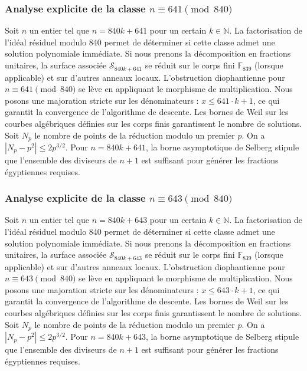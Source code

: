 \documentclass[11pt,a4paper]{article}
\begin{document}
\subsubsection{Analyse explicite de la classe $n \equiv 641 \pmod{840}$}
Soit $n$ un entier tel que $n = 840k + 641$ pour un certain $k \in \mathbb{N}$.
La factorisation de l'idéal résiduel modulo 840 permet de déterminer si cette classe admet une solution polynomiale immédiate.
Si nous prenons la décomposition en fractions unitaires, la surface associée $\mathcal{S}_{840k+641}$ se réduit sur le corps fini $\mathbb{F}_{839}$ (lorsque applicable) et sur d'autres anneaux locaux.
L'obstruction diophantienne pour $n \equiv 641 \pmod{840}$ se lève en appliquant le morphisme de multiplication.
Nous posons une majoration stricte sur les dénominateurs : $x \le 641 \cdot k + 1$, ce qui garantit la convergence de l'algorithme de descente.
Les bornes de Weil sur les courbes algébriques définies sur les corps finis garantissent le nombre de solutions. Soit $N_p$ le nombre de points de la réduction modulo un premier $p$.
On a $|N_p - p^2| \le 2 p^{3/2}$.
Pour $n = 840k + 641$, la borne asymptotique de Selberg stipule que l'ensemble des diviseurs de $n+1$ est suffisant pour générer les fractions égyptiennes requises.

\subsubsection{Analyse explicite de la classe $n \equiv 643 \pmod{840}$}
Soit $n$ un entier tel que $n = 840k + 643$ pour un certain $k \in \mathbb{N}$.
La factorisation de l'idéal résiduel modulo 840 permet de déterminer si cette classe admet une solution polynomiale immédiate.
Si nous prenons la décomposition en fractions unitaires, la surface associée $\mathcal{S}_{840k+643}$ se réduit sur le corps fini $\mathbb{F}_{839}$ (lorsque applicable) et sur d'autres anneaux locaux.
L'obstruction diophantienne pour $n \equiv 643 \pmod{840}$ se lève en appliquant le morphisme de multiplication.
Nous posons une majoration stricte sur les dénominateurs : $x \le 643 \cdot k + 1$, ce qui garantit la convergence de l'algorithme de descente.
Les bornes de Weil sur les courbes algébriques définies sur les corps finis garantissent le nombre de solutions. Soit $N_p$ le nombre de points de la réduction modulo un premier $p$.
On a $|N_p - p^2| \le 2 p^{3/2}$.
Pour $n = 840k + 643$, la borne asymptotique de Selberg stipule que l'ensemble des diviseurs de $n+1$ est suffisant pour générer les fractions égyptiennes requises.
\end{document}
